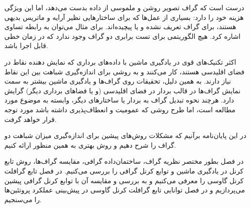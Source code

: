 درست است که گراف تصویر روشن و ملموسی از داده بدست می‌دهد، اما این ویژگی هزینه خود را دارد: بسیاری از عمل‌ها که برای ساختارهایی نظیر آرایه و ماتریس بدیهی هستند، برای گراف تعریف نشده و یا پیچیده‌اند. برای مثال می‌توان به رابطه تساوی اشاره کرد. هیچ الگوریتمی برای تست برابری دو گراف وجود ندارد که در زمان خطی قابل اجرا باشد.

اکثر تکنیک‌های قوی در یادگیری ماشین با داده‌های برداری که نمایش دهنده نقاط در فضای اقلیدسی هستند، کار می‌کنند و به روشی برای اندازه‌گیری شباهت بین این نقاط نیاز دارند. به همین دلیل، تحقیقات روی گراف‌ها و یادگیری ماشین بیشتر به سمت نمایش گراف‌ها در قالب بردار در فضای اقلیدسی (و یا فضاهای برداری دیگر) گرایش دارد. هرچند نحوه تبدیل گراف به بردار یا ساختارهای دیگر، وابسته به موضوع مورد مطالعه است، اما طرح روشی که عمومیت و انعطاف‌پذیری داشته باشد مورد توجه قرار خواهد گرفت.

در این پایان‌نامه برآنیم که مشکلات روش‌های پیشین برای اندازه‌گیری میزان شباهت دو گراف را شرح دهیم و روش بهتری به همین منظور ارائه کنیم.

در فصل  بطور مختصر نظریه گراف، ساختمان‌داده‌ گرافی، مقایسه گراف‌ها، روش تابع کرنل در یادگیری ماشین و توابع کرنل گرافی را بررسی می‌کنیم. در فصل  تابع گرافلت کرنل گاوسی را معرفی می‌کنیم و به بررسی و مقایسه آن با توابع کرنل گرافی پیشین می‌پردازیم و در فصل  توانایی تابع گرافلت کرنل گاوسی در پیش‌بینی عملکرد پروتئین‌ها را می‌سنجیم.